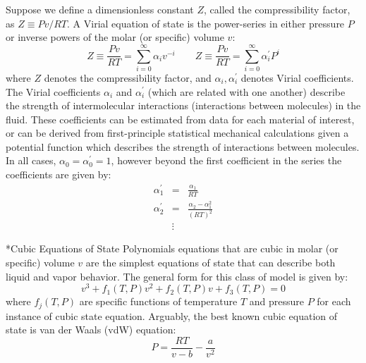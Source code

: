 \documentclass[11pt]{article}
\makeatletter
\theoremstyle{definition}
\renewcommand\subsubsection{\@startsection
	{subsubsection}{2}{0mm}
	{-0.05in}
	{-0.5\baselineskip}
	{\normalfont\normalsize\bfseries}}
\makeatother
\begin{document}
Suppose we define a dimensionless constant $Z$, called the compressibility factor, as $Z \equiv {Pv}/{RT}$.
A Virial equation of state is the power-series in either pressure $P$ or
inverse powers of the molar (or specific) volume $v$:
\begin{equation}
  \displaystyle Z \equiv \frac{Pv}{RT} = \sum_{i=0}^{\infty}\alpha_{i}v^{-i}\qquad
  \displaystyle Z \equiv \frac{Pv}{RT} = \sum_{i=0}^{\infty}\alpha^{\prime}_{i}P^{i}
\end{equation}
where $Z$ denotes the compressibility factor, and $\alpha_{i},\alpha^{\prime}_{i}$ denotes Virial coefficients.
The Virial coefficients $\alpha_{i}$ and $\alpha^{\prime}_{i}$ (which are related with one another)
describe the strength of intermolecular interactions (interactions between molecules) in the fluid.
These coefficients can be estimated from data for each material of interest, or can be derived
from first-principle statistical mechanical calculations given a potential function which describes the strength of interactions between molecules.
In all cases, $\alpha_{0}=\alpha^{\prime}_{0}=1$, however beyond the first coefficient in the series the coefficients are given by:
\begin{eqnarray*}\nonumber
  \alpha_{1}^{\prime} &=& \frac{\alpha_{1}}{RT}\\\nonumber
  \alpha_{2}^{\prime} &=& \frac{\alpha_{2}-\alpha_{1}^2}{\left(RT\right)^2}\\\nonumber
  & \vdots &
\end{eqnarray*}

\subsubsection*{Cubic Equations of State}
Polynomials equations that are cubic in molar (or specific) volume $v$ are the simplest equations of state that can describe both liquid and vapor behavior.
The general form for this class of model is given by:
\begin{equation}
v^{3}+f_{1}(T,P)v^2+f_{2}(T,P)v+f_{3}(T,P) = 0
\end{equation}
where $f_{j}(T,P)$ are specific functions of temperature $T$ and pressure $P$ for each instance of cubic state equation.
Arguably, the best known cubic equation of state is van der Waals (vdW) equation:
\begin{equation}
  \displaystyle P = \frac{RT}{v-b} - \frac{a}{v^2}
\end{equation}
\end{document}
